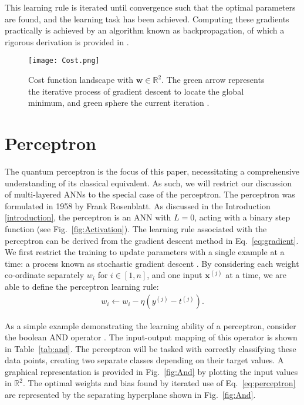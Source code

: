 \documentclass[twocolumn,superscriptaddress]{revtex4-1}
\begin{document}
This learning rule is iterated until convergence such that the optimal parameters are found, and the learning task has been achieved. Computing these gradients practically is achieved by an algorithm known as backpropagation, of which a rigorous derivation is provided in \cite{nielsenneural}.

\begin{figure}[t!]
\texttt{[image: Cost.png]}
\caption{Cost function landscape with $\bm{w} \in \mathbb{R}^2$. The green arrow represents the iterative process of gradient descent to locate the global minimum, and green sphere the current iteration \cite{nielsenneural}.}
\label{fig:Cost}
\end{figure}

\section{Perceptron} \label{perceptronsection}

The quantum perceptron is the focus of this paper, necessitating a comprehensive understanding of its classical equivalent. As such, we will restrict our discussion of multi-layered ANNs to the special case of the perceptron. The perceptron was formulated in 1958 by Frank Rosenblatt. As discussed in the Introduction \ref{introduction}, the perceptron is an ANN with $L=0$, acting with a binary step function (see Fig.~\ref{fig:Activation}). The learning rule associated with the perceptron can be derived from the gradient descent method in Eq.~\ref{eq:gradient}. We first restrict the training to update parameters with a single example at a time: a process known as stochastic gradient descent \cite{Ahmed2015}. By considering each weight co-ordinate separately $w_i$ for $i \in [1,n]$, and one input $\bm{x}^{(j)}$ at a time, we are able to define the perceptron learning rule:
\begin{equation} \label{eq:perceptron}
\begin{split}
w_i \leftarrow w_i - \eta (y^{(j)} - t^{(j)}).
\end{split}
\end{equation}

As a simple example demonstrating the learning ability of a perceptron, consider the boolean AND operator \cite{Roger2018}. The input-output mapping of this operator is shown in Table~\ref{tab:and}. The perceptron will be tasked with correctly classifying these data points, creating two separate classes depending on their target values. A graphical representation is provided in Fig.~\ref{fig:And} by plotting the input values in $\mathbb{R}^2$. The optimal weights and bias found by iterated use of Eq.~\ref{eq:perceptron} are represented by the separating hyperplane shown in Fig.~\ref{fig:And}.
\end{document}

